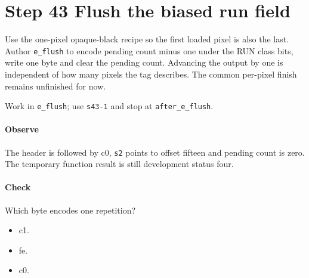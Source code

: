 \section{Step 43 Flush the biased run field}\label{qoi-s43}
Use the one-pixel opaque-black recipe so the first loaded pixel is also the last. Author \texttt{e\_flush} to encode pending count minus one under the RUN class bits, write one byte and clear the pending count. Advancing the output by one is independent of how many pixels the tag describes. The common per-pixel finish remains unfinished for now.

Work in \texttt{e\_flush}; use \texttt{s43-1} and stop at \texttt{after\_e\_flush}.

\paragraph{Observe} The header is followed by c0, \texttt{s2} points to offset fifteen and pending count is zero. The temporary function result is still development status four.

\paragraph{Check} Which byte encodes one repetition?
\begin{itemize}
\item[A.] c1.
\item[B.] fe.
\item[C.] c0.
\end{itemize}
